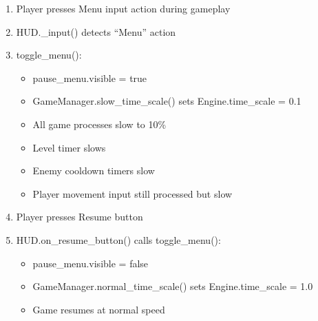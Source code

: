 \documentclass{article}
\begin{document}
\begin{enumerate}
    \item Player presses Menu input action during gameplay
    \item HUD.\_input() detects ``Menu'' action
    \item toggle\_menu():
    \begin{itemize}
        \item pause\_menu.visible = true
        \item GameManager.slow\_time\_scale() sets Engine.time\_scale = 0.1
        \item All game processes slow to 10\%
        \item Level timer slows
        \item Enemy cooldown timers slow
        \item Player movement input still processed but slow
    \end{itemize}
    \item Player presses Resume button
    \item HUD.on\_resume\_button() calls toggle\_menu():
    \begin{itemize}
        \item pause\_menu.visible = false
        \item GameManager.normal\_time\_scale() sets Engine.time\_scale = 1.0
        \item Game resumes at normal speed
    \end{itemize}
\end{enumerate}
\end{document}
